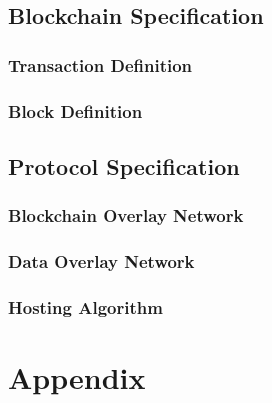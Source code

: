 \documentclass[11pt,fleqn]{book} %
\begin{document}


\chapter{Blockchain Specification}

\section{Transaction Definition}

\section{Block Definition}

\chapter{Protocol Specification}

\section{Blockchain Overlay Network}
\section{Data Overlay Network}
\section{Hosting Algorithm}

\part{Appendix}
\end{document}
